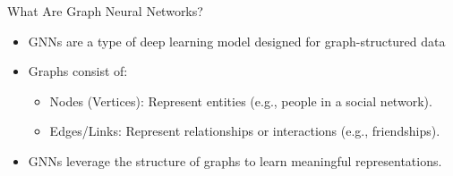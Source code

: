 \documentclass{beamer}
\begin{document}
\begin{frame}{What Are Graph Neural Networks?}
    \begin{itemize}
        \item GNNs are a type of deep learning model designed for graph-structured data
        \item Graphs consist of:
                \begin{itemize}
                \item Nodes (Vertices): Represent entities (e.g., people in a social network).
                \item Edges/Links: Represent relationships or interactions (e.g., friendships).

                \vspace{0.3cm}
                \centering %
                \end{itemize}
        \item GNNs leverage the structure of graphs to learn meaningful representations.
    \end{itemize}

\end{frame}
\end{document}
